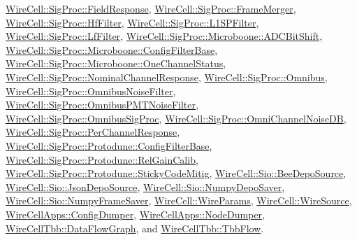 \hyperlink{class_wire_cell_1_1_sig_proc_1_1_field_response}{Wire\+Cell\+::\+Sig\+Proc\+::\+Field\+Response}, \hyperlink{class_wire_cell_1_1_sig_proc_1_1_frame_merger}{Wire\+Cell\+::\+Sig\+Proc\+::\+Frame\+Merger}, \hyperlink{class_wire_cell_1_1_sig_proc_1_1_hf_filter}{Wire\+Cell\+::\+Sig\+Proc\+::\+Hf\+Filter}, \hyperlink{class_wire_cell_1_1_sig_proc_1_1_l1_s_p_filter}{Wire\+Cell\+::\+Sig\+Proc\+::\+L1\+S\+P\+Filter}, \hyperlink{class_wire_cell_1_1_sig_proc_1_1_lf_filter}{Wire\+Cell\+::\+Sig\+Proc\+::\+Lf\+Filter}, \hyperlink{class_wire_cell_1_1_sig_proc_1_1_microboone_1_1_a_d_c_bit_shift}{Wire\+Cell\+::\+Sig\+Proc\+::\+Microboone\+::\+A\+D\+C\+Bit\+Shift}, \hyperlink{class_wire_cell_1_1_sig_proc_1_1_microboone_1_1_config_filter_base}{Wire\+Cell\+::\+Sig\+Proc\+::\+Microboone\+::\+Config\+Filter\+Base}, \hyperlink{class_wire_cell_1_1_sig_proc_1_1_microboone_1_1_one_channel_status}{Wire\+Cell\+::\+Sig\+Proc\+::\+Microboone\+::\+One\+Channel\+Status}, \hyperlink{class_wire_cell_1_1_sig_proc_1_1_nominal_channel_response}{Wire\+Cell\+::\+Sig\+Proc\+::\+Nominal\+Channel\+Response}, \hyperlink{class_wire_cell_1_1_sig_proc_1_1_omnibus}{Wire\+Cell\+::\+Sig\+Proc\+::\+Omnibus}, \hyperlink{class_wire_cell_1_1_sig_proc_1_1_omnibus_noise_filter}{Wire\+Cell\+::\+Sig\+Proc\+::\+Omnibus\+Noise\+Filter}, \hyperlink{class_wire_cell_1_1_sig_proc_1_1_omnibus_p_m_t_noise_filter}{Wire\+Cell\+::\+Sig\+Proc\+::\+Omnibus\+P\+M\+T\+Noise\+Filter}, \hyperlink{class_wire_cell_1_1_sig_proc_1_1_omnibus_sig_proc}{Wire\+Cell\+::\+Sig\+Proc\+::\+Omnibus\+Sig\+Proc}, \hyperlink{class_wire_cell_1_1_sig_proc_1_1_omni_channel_noise_d_b}{Wire\+Cell\+::\+Sig\+Proc\+::\+Omni\+Channel\+Noise\+DB}, \hyperlink{class_wire_cell_1_1_sig_proc_1_1_per_channel_response}{Wire\+Cell\+::\+Sig\+Proc\+::\+Per\+Channel\+Response}, \hyperlink{class_wire_cell_1_1_sig_proc_1_1_protodune_1_1_config_filter_base}{Wire\+Cell\+::\+Sig\+Proc\+::\+Protodune\+::\+Config\+Filter\+Base}, \hyperlink{class_wire_cell_1_1_sig_proc_1_1_protodune_1_1_rel_gain_calib}{Wire\+Cell\+::\+Sig\+Proc\+::\+Protodune\+::\+Rel\+Gain\+Calib}, \hyperlink{class_wire_cell_1_1_sig_proc_1_1_protodune_1_1_sticky_code_mitig}{Wire\+Cell\+::\+Sig\+Proc\+::\+Protodune\+::\+Sticky\+Code\+Mitig}, \hyperlink{class_wire_cell_1_1_sio_1_1_bee_depo_source}{Wire\+Cell\+::\+Sio\+::\+Bee\+Depo\+Source}, \hyperlink{class_wire_cell_1_1_sio_1_1_json_depo_source}{Wire\+Cell\+::\+Sio\+::\+Json\+Depo\+Source}, \hyperlink{class_wire_cell_1_1_sio_1_1_numpy_depo_saver}{Wire\+Cell\+::\+Sio\+::\+Numpy\+Depo\+Saver}, \hyperlink{class_wire_cell_1_1_sio_1_1_numpy_frame_saver}{Wire\+Cell\+::\+Sio\+::\+Numpy\+Frame\+Saver}, \hyperlink{class_wire_cell_1_1_wire_params}{Wire\+Cell\+::\+Wire\+Params}, \hyperlink{class_wire_cell_1_1_wire_source}{Wire\+Cell\+::\+Wire\+Source}, \hyperlink{class_wire_cell_apps_1_1_config_dumper}{Wire\+Cell\+Apps\+::\+Config\+Dumper}, \hyperlink{class_wire_cell_apps_1_1_node_dumper}{Wire\+Cell\+Apps\+::\+Node\+Dumper}, \hyperlink{class_wire_cell_tbb_1_1_data_flow_graph}{Wire\+Cell\+Tbb\+::\+Data\+Flow\+Graph}, and \hyperlink{class_wire_cell_tbb_1_1_tbb_flow}{Wire\+Cell\+Tbb\+::\+Tbb\+Flow}.



